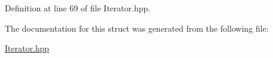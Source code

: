 Definition at line 69 of file Iterator.\+hpp.



The documentation for this struct was generated from the following file\+:\begin{DoxyCompactItemize}
\item 
\hyperlink{Iterator_8hpp}{Iterator.\+hpp}\end{DoxyCompactItemize}
